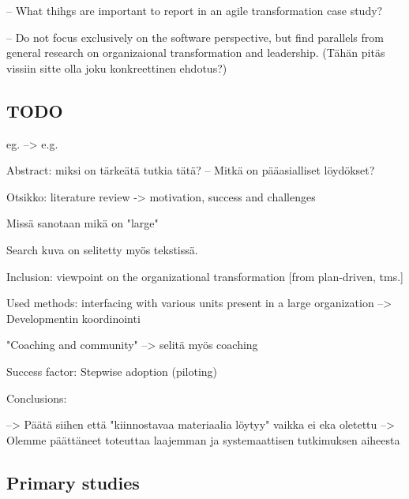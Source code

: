 \documentclass[lnbip]{svmultln}
\begin{document}
-- What thihgs are important to report in an agile transformation case study?

-- Do not focus exclusively on the software perspective, but find parallels from
general research on organizaional transformation and leadership. (Tähän pitäs
vissiin sitte olla joku konkreettinen ehdotus?)



\subsection{TODO}

eg. --> e.g.


Abstract: miksi on tärkeätä tutkia tätä?
-- Mitkä on pääasialliset löydökset?


Otsikko:
literature review -> motivation, success and challenges


Missä sanotaan mikä on "large"


Search kuva on selitetty myös tekstissä.


Inclusion: viewpoint on the organizational transformation [from plan-driven, tms.]


Used methods: interfacing with various units present in a large organization
--> Developmentin koordinointi


"Coaching and community" --> selitä myös coaching


Success factor: Stepwise adoption (piloting)


Conclusions:

--> Päätä siihen että "kiinnostavaa materiaalia löytyy" vaikka ei eka oletettu
--> Olemme päättäneet toteuttaa laajemman ja systemaattisen tutkimuksen aiheesta



\small





\subsection*{Primary studies}
\end{document}
